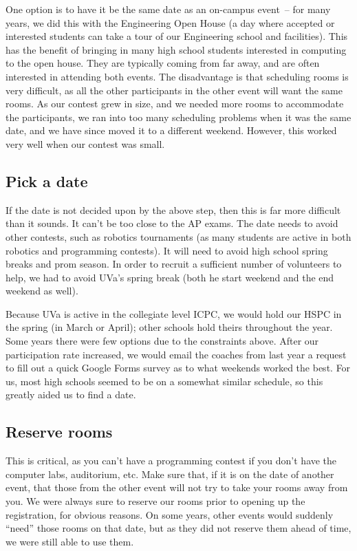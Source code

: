 \documentclass[11pt,twoside,letterpaper]{book}
\begin{document}
One option is to have it be the same date as an on-campus event~-- for
many years, we did this with the Engineering Open House (a day where
accepted or interested students can take a tour of our Engineering
school and facilities).  This has the benefit of bringing in many high
school students interested in computing to the open house.  They are
typically coming from far away, and are often interested in attending
both events.  The disadvantage is that scheduling rooms is very
difficult, as all the other participants in the other event will want
the same rooms.  As our contest grew in size, and we needed more rooms
to accommodate the participants, we ran into too many scheduling
problems when it was the same date, and we have since moved it to a
different weekend.  However, this worked very well when our contest
was small.


\subsection*{Pick a date}

If the date is not decided upon by the above step, then this is far
more difficult than it sounds.  It can't be too close to the AP exams.
The date needs to avoid other contests, such as robotics tournaments
(as many students are active in both robotics and programming
contests).  It will need to avoid high school spring breaks and prom
season. In order to recruit a sufficient number of volunteers to help,
we had to avoid UVa's spring break (both he start weekend and the end
weekend as well).

Because UVa is active in the collegiate level ICPC, we would hold our
HSPC in the spring (in March or April); other schools hold theirs
throughout the year.  Some years there were few options due to the
constraints above.  After our participation rate increased, we would
email the coaches from last year a request to fill out a quick Google
Forms survey as to what weekends worked the best.  For us, most high
schools seemed to be on a somewhat similar schedule, so this greatly
aided us to find a date.


\subsection*{Reserve rooms}

This is critical, as you can't have a programming contest if you don't
have the computer labs, auditorium, etc.  Make sure that, if it is on
the date of another event, that those from the other event will not
try to take your rooms away from you. We were always sure to reserve
our rooms prior to opening up the registration, for obvious reasons.
On some years, other events would suddenly ``need'' those rooms on
that date, but as they did not reserve them ahead of time, we were
still able to use them.
\end{document}
